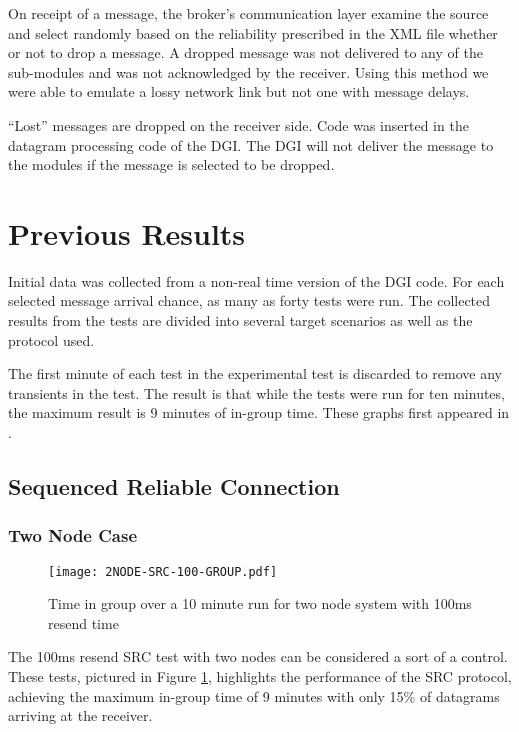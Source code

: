 On receipt of a message, the broker's communication layer examine the source
and select randomly based on the reliability prescribed in the XML file whether
or not to drop a message. A dropped message was not delivered to any of the
sub-modules and was not acknowledged by the receiver. Using this method we were 
able to emulate a lossy network link but not one with message delays.

``Lost'' messages are dropped on the receiver side. Code was inserted in the
datagram processing code of the DGI. The DGI will not deliver the message to
the modules if the message is selected to be dropped.

\section{Previous Results}
Initial data was collected from a non-real time version of the DGI code.
For each selected message arrival chance, as many as forty tests were run.
The collected results from the tests are divided into several target scenarios
as well as the protocol used.

The first minute of each test in the experimental test is discarded to remove
any transients in the test. The result is that while the tests were run for
ten minutes, the maximum result is 9 minutes of in-group time. These graphs
first appeared in \cite{CRITIS2012}.

\subsection{Sequenced Reliable Connection}

\subsubsection{Two Node Case}

\begin{figure}[!h]
\centering
\texttt{[image: 2NODE-SRC-100-GROUP.pdf]}
\caption{Time in group over a 10 minute run for two node system with 100ms resend time}
\label{fig:IGT-SRC-2NODE-100}
\end{figure}

The 100ms resend SRC test with two nodes can be considered a sort of a control.
These tests, pictured in Figure \ref{fig:IGT-SRC-2NODE-100}, highlights the performance of the
SRC protocol, achieving the maximum in-group time of 9 minutes with only 15\%
of datagrams arriving at the receiver. 

